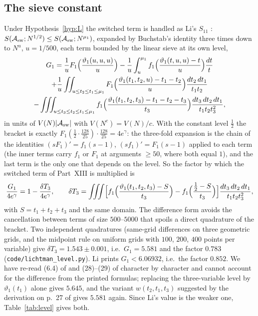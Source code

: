 \documentclass[11pt]{amsart}
\theoremstyle{remark}
\newcommand{\cA}{\mathcal A}
\begin{document}
\subsection{The sieve constant}
Under Hypothesis~\ref{hyp:L} the switched term is handled as Li's $S_{11}$ \cite[(26)--(29)]{Li}: $S(\cA_{\rm sw};N^{1/2})\le S(\cA_{\rm sw};N^{\mu_1})$, expanded by Buchstab's identity three times down to $N^u$, $u=1/500$, each term bounded by the linear sieve at its own level,
\begin{multline*}
G_1=\frac1uF_1\Bigl(\frac{\vartheta_1(u,u,u)}u\Bigr)-\frac1u\int_u^{\mu_1}f_1\Bigl(\frac{\vartheta_1(t,u,u)-t}u\Bigr)\frac{dt}t\\
+\frac1u\iint_{u\le t_2\le t_1\le\mu_1}F_1\Bigl(\frac{\vartheta_1(t_1,t_2,u)-t_1-t_2}u\Bigr)\frac{dt_2\,dt_1}{t_1t_2}\\
-\iiint_{u\le t_3\le t_2\le t_1\le\mu_1}f_1\Bigl(\frac{\vartheta_1(t_1,t_2,t_3)-t_1-t_2-t_3}{t_3}\Bigr)\frac{dt_3\,dt_2\,dt_1}{t_1t_2t_3^2},
\end{multline*}
in units of $V(N)|\cA_{\rm sw}|$ with $V(N^c)=V(N)/c$. With the constant level $\frac12$ the bracket is exactly $F_1(\frac12\cdot\frac{128}{25})\cdot\frac{128}{25}=4e^\gamma$: the three-fold expansion is the chain of the identities $(sF_1)'=f_1(s-1)$, $(sf_1)'=F_1(s-1)$ applied to each term (the inner terms carry $f_1$ or $F_1$ at arguments $\ge50$, where both equal $1$), and the last term is the only one that depends on the level. So the factor by which the switched term of Part~XIII is multiplied is
\[
\frac{G_1}{4e^\gamma}=1-\frac{\delta T_3}{4e^\gamma},\qquad \delta T_3=\iiint\Bigl[f_1\Bigl(\frac{\vartheta_1(t_1,t_2,t_3)-S}{t_3}\Bigr)-f_1\Bigl(\frac{\frac12-S}{t_3}\Bigr)\Bigr]\frac{dt_3\,dt_2\,dt_1}{t_1t_2t_3^2},
\]
with $S=t_1+t_2+t_3$ and the same domain.
The difference form avoids the cancellation between terms of size $500$--$5000$ that spoils a direct quadrature of the bracket. Two independent quadratures (same-grid differences on three geometric grids, and the midpoint rule on uniform grids with $100$, $200$, $400$ points per variable) give $\delta T_3=1.543\pm0.001$, i.e.\ $G_1=5.581$ and the factor $0.783$ (\texttt{code/lichtman\_level.py}). Li prints $G_1<6.06932$, i.e.\ the factor $0.852$. We have re-read (6.4) of \cite{Lichtman} and (28)--(29) of \cite{Li} character by character and cannot account for the difference from the printed formulas; replacing the three-variable level by $\vartheta_1(t_1)$ alone gives $5.645$, and the variant $w(t_2,t_1,t_3)$ suggested by the derivation on p.~27 of \cite{Lichtman} gives $5.581$ again. Since Li's value is the weaker one, Table~\ref{tab:level} gives both.
\end{document}
